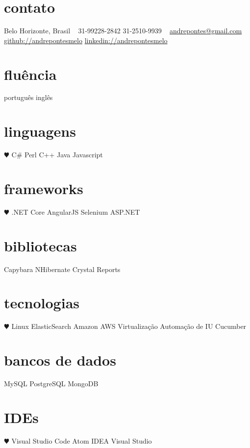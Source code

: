\documentclass[]{friggeri-cv}
\begin{document}


\begin{aside}
\section{contato}
Belo Horizonte, Brasil
~
31-99228-2842
31-2510-9939
~
\href{mailto:andrepontes@gmail.com}{andrepontes@gmail.com}
\href{https://github.com/andrepontesmelo}{github://andrepontesmelo}
\href{https://br.linkedin.com/in/andrepontesmelo}{linkedin://andrepontesmelo}
\section{fluência}
português
inglês
\section{linguagens}
{\color{red} $\varheartsuit$} C\#
Perl
C++
Java
Javascript
\section{frameworks}
 {\color{red} $\varheartsuit$} .NET Core
AngularJS
Selenium
ASP.NET
\section{bibliotecas}
Capybara
NHibernate
Crystal Reports
\section{tecnologias}
 {\color{red} $\varheartsuit$} Linux
ElasticSearch
Amazon AWS
Virtualização
Automação de IU
Cucumber
\section{bancos de dados}
MySQL
PostgreSQL
MongoDB
\section{IDEs}
{\color{red} $\varheartsuit$} Visual Studio Code
Atom
IDEA
Visual Studio
\end{aside}
\end{document}
